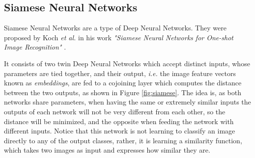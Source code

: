 

\subsection{Siamese Neural Networks}
\label{sec:siamese}
Siamese Neural Networks are a type of Deep Neural Networks. They were proposed by Koch \emph{et al.} in his work \emph{"Siamese Neural Networks for One-shot Image Recognition"} \cite{koch2015siamese}.

It consists of two twin Deep Neural Networks which accept distinct inputs, whose parameters are tied together, and their output, \emph{i.e.} the image feature vectors known as \emph{embeddings}, are fed to a cojoining layer which computes the distance between the two outputs, as shown in Figure \ref{fig:siamese}. The idea is, as both networks share parameters, when having the same or extremely similar inputs the outputs of each network will not be very different from each other, so the distance will be minimized, and the opposite when feeding the network with different inputs. Notice that this network is not learning to classify an image directly to any of the output classes, rather, it is learning a similarity function, which takes two images as input and expresses how similar they are.

